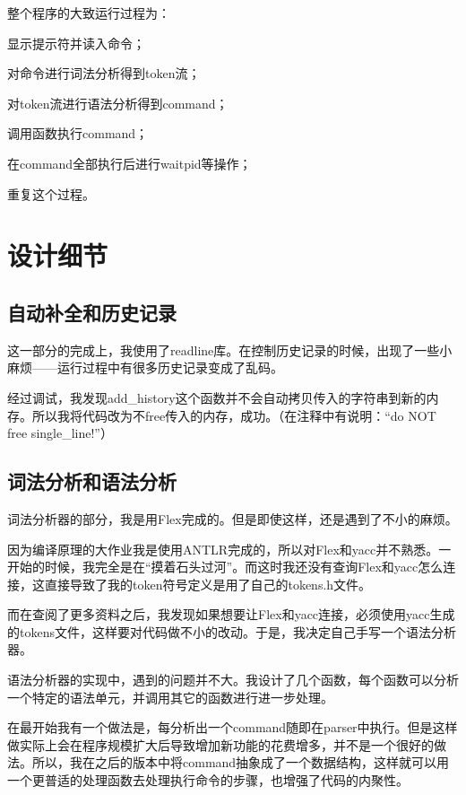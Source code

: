 \documentclass{article}
\begin{document}
整个程序的大致运行过程为：

\begin{enumerate*}
\item 显示提示符并读入命令；
\item 对命令进行词法分析得到token流；
\item 对token流进行语法分析得到command；
\item 调用函数执行command；
\item 在command全部执行后进行waitpid等操作；
\item 重复这个过程。
\end{enumerate*}

\section{设计细节}

\subsection{自动补全和历史记录}
这一部分的完成上，我使用了readline库。在控制历史记录的时候，出现了一些小麻烦——运行过程中有很多历史记录变成了乱码。

经过调试，我发现add\_history这个函数并不会自动拷贝传入的字符串到新的内存。所以我将代码改为不free传入的内存，成功。（在注释中有说明：``do NOT free single\_line!''）

\subsection{词法分析和语法分析}
词法分析器的部分，我是用Flex完成的。但是即使这样，还是遇到了不小的麻烦。

因为编译原理的大作业我是使用ANTLR完成的，所以对Flex和yacc并不熟悉。一开始的时候，我完全是在“摸着石头过河”。而这时我还没有查询Flex和yacc怎么连接，这直接导致了我的token符号定义是用了自己的tokens.h文件。

而在查阅了更多资料之后，我发现如果想要让Flex和yacc连接，必须使用yacc生成的tokens文件，这样要对代码做不小的改动。于是，我决定自己手写一个语法分析器。

语法分析器的实现中，遇到的问题并不大。我设计了几个函数，每个函数可以分析一个特定的语法单元，并调用其它的函数进行进一步处理。

在最开始我有一个做法是，每分析出一个command随即在parser中执行。但是这样做实际上会在程序规模扩大后导致增加新功能的花费增多，并不是一个很好的做法。所以，我在之后的版本中将command抽象成了一个数据结构，这样就可以用一个更普适的处理函数去处理执行命令的步骤，也增强了代码的内聚性。
\end{document}
